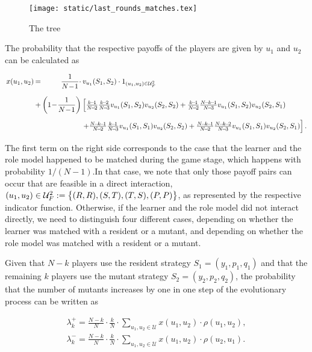 \documentclass[11pt]{article}
\newcommand{\splitatcommas}[1]{%
  \begingroup
  \begingroup\lccode`~=`, \lowercase{\endgroup
    \edef~{\mathchar\the\mathcode`, \penalty0 \noexpand\hspace{0pt plus 1em}}%
  }\mathcode`,="8000 #1%
  \endgroup
}
\theoremstyle{plainCl1}
\theoremstyle{plainCl2}
\begin{document}
\begin{figure}[!htbp]
  \centering
  \texttt{[image: static/last\_rounds\_matches.tex]}
  \caption{The tree}\label{fig:single_pairs}
\end{figure}

The probability that the respective payoffs of the players
are given by $u_1$ and $u_2$ can be calculated as

\begin{equation}\label{eq:Chi}
\setlength{\arraycolsep}{1pt}
\begin{array}{llrl}
x(u_1,u_2)	 &=&\displaystyle \frac{1}{N\!-\!1}\cdot  &v_{u_1}(S_1,S_2)\cdot 1_{(u_1,u_2)\in \mathcal{U}^2_F}\\[0.5cm]
&+	
&\displaystyle \left(1\!-\!\frac{1}{N\!-\!1}\right)  
&\left[ \frac{k\!-\!1}{N\!-\!2}\frac{k\!-\!2}{N\!-\!3} v_{u_1}(S_1,S_2) v_{u_2}(S_2,S_2) + 
 \frac{k\!-\!1}{N\!-\!2}\frac{N\!-\!k\!-\!1}{N\!-\!3} v_{u_1}(S_1,S_2) v_{u_2}(S_2,S_1)\right.\\[0.5cm]
&&&\left. +\frac{N\!-\!k\!-\!1}{N\!-\!2}\frac{k\!-\!1}{N\!-\!3} v_{u_1}(S_1,S_1) v_{u_2}(S_2,S_2) + 
 \frac{N\!-\!k\!-\!1}{N\!-\!2}\frac{N\!-\!k\!-\!2}{N\!-\!3} v_{u_1}(S_1,S_1) v_{u_2}(S_2,S_1)\right].
\end{array}
\end{equation}

The first term on the right side corresponds to the case that the learner and
the role model happened to be matched during the game stage, which happens with
probability $1/(N\!-\!1)$.In that case, we note that only those payoff pairs
can occur that are feasible in a direct interaction, $\splitatcommas{(u_1,u_2)\in
\mathcal{U}^2_F:=\big\{ (R,R), (S,T), (T,S), (P,P) \big\}}$, as represented by
the respective indicator function. Otherwise, if the learner and the role model
did not interact directly, we need to distinguish four different cases,
depending on whether the learner was matched with a resident or a mutant, and
depending on whether the role model was matched with a resident or a mutant.

Given that $N\!-\!k$ players use the resident strategy $S_1\!=\!(y_1,p_1,q_1)$
and that the remaining $k$ players use the mutant strategy
$S_2\!=\!(y_2,p_2,q_2)$, the probability that the number of mutants increases by
one in one step of the evolutionary process can be written as

\begin{align}
\lambda^+_k=\frac{N\!-\!k}{N}\cdot \frac{k}{N}\cdot \sum_{u_1,u_2\in\mathcal{U}} x(u_1,u_2)\cdot \rho(u_1,u_2), \\
\lambda^-_k=\frac{N\!-\!k}{N}\cdot \frac{k}{N}\cdot \sum_{u_1,u_2\in\mathcal{U}} x(u_1,u_2)\cdot \rho(u_2,u_1).
\end{align}
\end{document}
